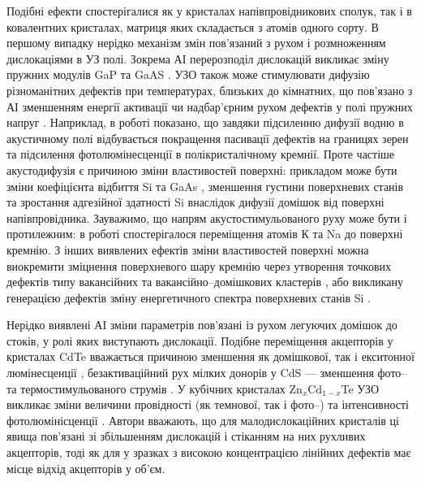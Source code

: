 Подібні ефекти спостерігалися як у кристалах напівпровідникових сполук, так і в ковалентних кристалах, матриця яких складається з атомів одного сорту.
В першому випадку нерідко механізм змін пов'язаний з рухом і розмноженням дислокаціями в УЗ полі.
Зокрема АІ перерозподіл дислокацій викликає зміну пружних модулів GaP та GaAS \cite{UST:GaP}.
УЗО також може стимулювати дифузію різноманітних дефектів при температурах, близьких до кімнатних, що пов'язано
з АІ зменшенням  енергії активації чи надбар'єрним рухом дефектів у полі пружних напруг \cite{USdif:FTT90}.
Наприклад, в роботі \cite{Ostapenko1999} показано, що завдяки підсиленню дифузії водню в акустичному полі відбувається покращення пасивації дефектів на границях зерен \cite{Ostapenko1999} та підсилення фотолюмінесценції \cite{Ostap:PhotoLum,ostapenko1997} в полікристалічному кремнії.
Проте частіше акустодифузія є причиною зміни властивостей поверхні:
прикладом може бути зміни коефіцієнта відбиття Si та GaAs \cite{Zaver}, зменшення густини  поверхневих станів \cite{Zaver:2008r} та зростання адгезійної здатності \cite{Zaver96} Si внаслідок дифузії домішок від поверхні напівпровідника.
Зауважимо, що напрям акустостимульованого руху може бути і протилежним:
в роботі \cite{Ostrov2002FTPr} спостерігалося переміщення атомів К та Na до поверхні кремнію.
З інших виявлених ефектів зміни властивостей поверхні можна виокремити зміцнення поверхневого шару кремнію через утворення точкових дефектів типу вакансійних та вакансійно--домішкових кластерів \cite{Ostrov2000FTPr},
 або викликану генерацією дефектів зміну енергетичного спектра поверхневих станів Si \cite{Zaver:2008r}.

Нерідко виявлені АІ зміни параметрів пов'язані із рухом легуючих домішок до стоків, у ролі яких виступають дислокації.
Подібне переміщення акцепторів у кристалах CdTe вважається причиною зменшення як домішкової, так і екситонної люмінесценції \cite{US:CdTe},
безактиваційний рух мілких донорів у CdS --- зменшення фото-- та термостимульованого струмів \cite{BorkovFTT,sheinkman1995,BORKOVSKA2003}.
У кубічних кристалах Zn$_x$Cd$_{1-x}$Te  УЗО викликає зміни величини провідності (як темнової, так і фото--) та інтенсивності фотолюмінісценції \cite{US:ZnCdTe}.
Автори вважають, що для малодислокаційних кристалів ці явища пов'язані зі збільшенням дислокацій і стіканням на них рухливих акцепторів, тоді як для у зразках з високою концентрацією лінійних дефектів має місце відхід акцепторів у об'єм.

